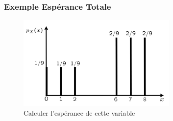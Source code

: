 \documentclass{beamer}
\begin{document}
\begin{frame}[t]
  \frametitle{Exemple Espérance Totale}
 \begin{figure}[htpb]
   \centering
   \includegraphics[width=0.7\textwidth]{./esperance_total_example.png}
   \caption{Calculer l'espérance de cette variable}
 \end{figure} 
 \pause
\end{frame}
\end{document}
